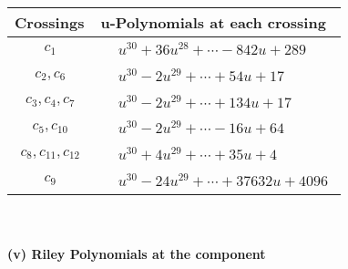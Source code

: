 \documentclass[1p]{elsarticle_modified}
\theoremstyle{definition}
\begin{document}
\begin{tabular}{m{50pt}|m{274pt}}
Crossings & \hspace{64pt}u-Polynomials at each crossing \\
\hline $$\begin{aligned}c_{1}\end{aligned}$$&$\begin{aligned}
&u^{30}+36 u^{28}+\cdots-842 u+289
\end{aligned}$\\
\hline $$\begin{aligned}c_{2},c_{6}\end{aligned}$$&$\begin{aligned}
&u^{30}-2 u^{29}+\cdots+54 u+17
\end{aligned}$\\
\hline $$\begin{aligned}c_{3},c_{4},c_{7}\end{aligned}$$&$\begin{aligned}
&u^{30}-2 u^{29}+\cdots+134 u+17
\end{aligned}$\\
\hline $$\begin{aligned}c_{5},c_{10}\end{aligned}$$&$\begin{aligned}
&u^{30}-2 u^{29}+\cdots-16 u+64
\end{aligned}$\\
\hline $$\begin{aligned}c_{8},c_{11},c_{12}\end{aligned}$$&$\begin{aligned}
&u^{30}+4 u^{29}+\cdots+35 u+4
\end{aligned}$\\
\hline $$\begin{aligned}c_{9}\end{aligned}$$&$\begin{aligned}
&u^{30}-24 u^{29}+\cdots+37632 u+4096
\end{aligned}$\\
\hline
\end{tabular}\\~\\
\newpage\renewcommand{\arraystretch}{1}
\flushleft \textbf{(v) Riley Polynomials at the component}\newline \\
\end{document}
